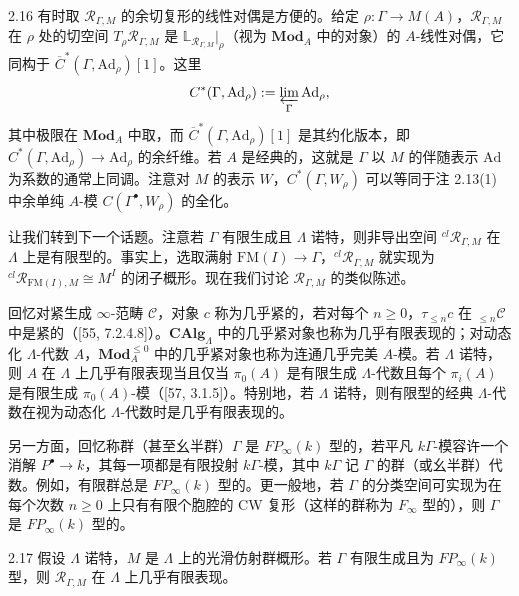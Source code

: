 \begin{rem}{2.16}\label{rem:a2-2-16}
有时取 $\mathcal R_{\Gamma,M}$ 的余切复形的线性对偶是方便的。给定 $\rho:\Gamma\to M(A)$，$\mathcal R_{\Gamma,M}$ 在 $\rho$ 处的切空间 $T_\rho\mathcal R_{\Gamma,M}$ 是 $\mathbb L_{\mathcal R_{\Gamma,M}}|_\rho$（视为 $\mathbf{Mod}_A$ 中的对象）的 $A$-线性对偶，它同构于 $\overline{C}^*(\Gamma,\mathrm{Ad}_\rho)[1]$。这里
\[
C^*(\Gamma,\mathrm{Ad}_\rho):=\varprojlim_{\Gamma}\mathrm{Ad}_\rho,
\]
其中极限在 $\mathbf{Mod}_A$ 中取，而 $\overline{C}^*(\Gamma,\mathrm{Ad}_\rho)[1]$ 是其约化版本，即 $C^*(\Gamma,\mathrm{Ad}_\rho)\to\mathrm{Ad}_\rho$ 的余纤维。若 $A$ 是经典的，这就是 $\Gamma$ 以 $M$ 的伴随表示 $\mathrm{Ad}$ 为系数的通常上同调。注意对 $M$ 的表示 $W$，$C^*(\Gamma,W_\rho)$ 可以等同于注 2.13(1) 中余单纯 $A$-模 $C(\Gamma^\bullet,W_\rho)$ 的全化。
\end{rem}

让我们转到下一个话题。注意若 $\Gamma$ 有限生成且 $\Lambda$ 诺特，则非导出空间 ${}^{cl}\mathcal R_{\Gamma,M}$ 在 $\Lambda$ 上是有限型的。事实上，选取满射 $\mathrm{FM}(I)\to\Gamma$，${}^{cl}\mathcal R_{\Gamma,M}$ 就实现为 ${}^{cl}\mathcal R_{\mathrm{FM}(I),M}\cong M^I$ 的闭子概形。现在我们讨论 $\mathcal R_{\Gamma,M}$ 的类似陈述。

回忆对紧生成 $\infty$-范畴 $\mathcal C$，对象 $c$ 称为几乎紧的，若对每个 $n\ge 0$，$\tau_{\le n}c$ 在 ${}_{\le n}\mathcal C$ 中是紧的（[55, 7.2.4.8]）。$\mathbf{CAlg}_\Lambda$ 中的几乎紧对象也称为几乎有限表现的；对动态化 $\Lambda$-代数 $A$，$\mathbf{Mod}_A^{\le 0}$ 中的几乎紧对象也称为连通几乎完美 $A$-模。若 $\Lambda$ 诺特，则 $A$ 在 $\Lambda$ 上几乎有限表现当且仅当 $\pi_0(A)$ 是有限生成 $\Lambda$-代数且每个 $\pi_i(A)$ 是有限生成 $\pi_0(A)$-模（[57, 3.1.5]）。特别地，若 $\Lambda$ 诺特，则有限型的经典 $\Lambda$-代数在视为动态化 $\Lambda$-代数时是几乎有限表现的。

另一方面，回忆称群（甚至幺半群）$\Gamma$ 是 $FP_\infty(k)$ 型的，若平凡 $k\Gamma$-模容许一个消解 $P^\bullet\to k$，其每一项都是有限投射 $k\Gamma$-模，其中 $k\Gamma$ 记 $\Gamma$ 的群（或幺半群）代数。例如，有限群总是 $FP_\infty(k)$ 型的。更一般地，若 $\Gamma$ 的分类空间可实现为在每个次数 $n\ge 0$ 上只有有限个胞腔的 CW 复形（这样的群称为 $F_\infty$ 型的），则 $\Gamma$ 是 $FP_\infty(k)$ 型的。

\begin{prop}{2.17}\label{prop:a2-2-17}
假设 $\Lambda$ 诺特，$M$ 是 $\Lambda$ 上的光滑仿射群概形。若 $\Gamma$ 有限生成且为 $FP_\infty(k)$ 型，则 $\mathcal R_{\Gamma,M}$ 在 $\Lambda$ 上几乎有限表现。
\end{prop}

